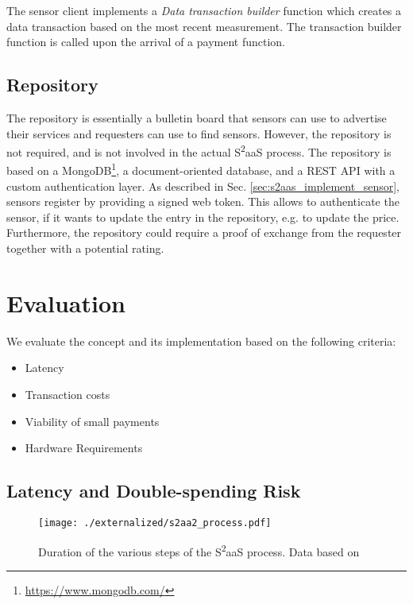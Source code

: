 The sensor client implements a \emph{Data transaction builder} function which creates a data transaction based on the most recent measurement. The transaction builder function is called upon the arrival of a payment function.

\subsection{Repository}

The repository is essentially a bulletin board that sensors can use to advertise their services and requesters can use to find sensors. However, the repository is not required, and is not involved in the actual S\textsuperscript{2}aaS process. The repository is based on a MongoDB\footnote{\url{https://www.mongodb.com/}}, a document-oriented database, and a \ac{REST} \ac{API} with a custom authentication layer. As described in Sec. \ref{sec:s2aas_implement_sensor}, sensors register by providing a signed web token. This allows to authenticate the sensor, if it wants to update the entry in the repository, e.g. to update the price. Furthermore, the repository could require a proof of exchange from the requester together with a potential rating. 


\section{Evaluation}
\label{sec:s2aas_eval}

We evaluate the concept and its implementation based on the following criteria:
\begin{itemize}
	\item Latency
	\item Transaction costs
    \item Viability of small payments
    \item Hardware Requirements
\end{itemize}


\subsection{Latency and Double-spending Risk}

\begin{figure}
\centering
\texttt{[image: ./externalized/s2aa2\_process.pdf]}
\caption{Duration of the various steps of the S\textsuperscript{2}aaS process. Data based on \parencite{Karame:2012:DFP:2382196.2382292,croman2016scaling}}
\label{fig:s2aasDuration}
\end{figure}


